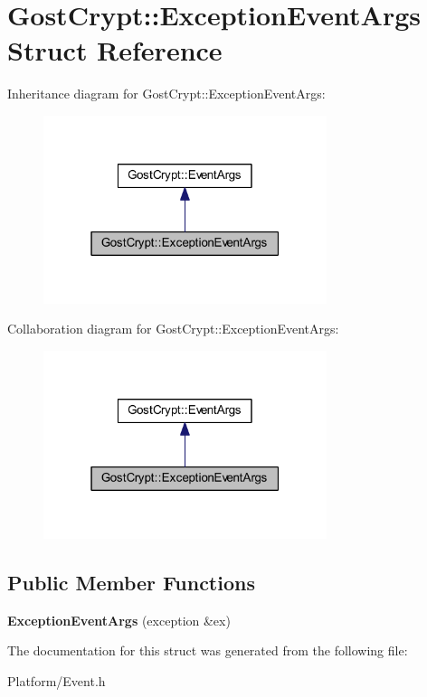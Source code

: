 \hypertarget{struct_gost_crypt_1_1_exception_event_args}{}\section{Gost\+Crypt\+:\+:Exception\+Event\+Args Struct Reference}
\label{struct_gost_crypt_1_1_exception_event_args}


Inheritance diagram for Gost\+Crypt\+:\+:Exception\+Event\+Args\+:
\nopagebreak
\begin{figure}[H]
\begin{center}
\leavevmode
\includegraphics[width=235pt]{struct_gost_crypt_1_1_exception_event_args__inherit__graph}
\end{center}
\end{figure}


Collaboration diagram for Gost\+Crypt\+:\+:Exception\+Event\+Args\+:
\nopagebreak
\begin{figure}[H]
\begin{center}
\leavevmode
\includegraphics[width=235pt]{struct_gost_crypt_1_1_exception_event_args__coll__graph}
\end{center}
\end{figure}
\subsection*{Public Member Functions}
\begin{DoxyCompactItemize}
\item 
\mbox{\label{struct_gost_crypt_1_1_exception_event_args_adc592f6a537239d713a3d94ae950808a}} 
{\bfseries Exception\+Event\+Args} (exception \&ex)
\end{DoxyCompactItemize}


The documentation for this struct was generated from the following file\+:\begin{DoxyCompactItemize}
\item 
Platform/Event.\+h\end{DoxyCompactItemize}
